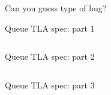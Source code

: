 \documentclass[12pt]{beamer}
\begin{document}
  {
  \begin{frame}{Can you guess type of bug?}
      \begin{center}
      \end{center}
  \end{frame}}
  \begin{frame}{Queue TLA spec: part 1}
      \begin{center}
          \inputminted[firstline=1,lastline=16,linenos,
            fontsize=\scriptsize]{tla}{figures/buffer.tla}
      \end{center}
  \end{frame}
  \begin{frame}{Queue TLA spec: part 2}
      \begin{center}
          \inputminted[firstline=16,lastline=31,linenos,
            fontsize=\scriptsize]{tla}{figures/buffer.tla}
      \end{center}
  \end{frame}
  \begin{frame}{Queue TLA spec: part 3}
      \begin{center}
          \inputminted[firstline=32,lastline=42,linenos,
            fontsize=\scriptsize]{tla}{figures/buffer.tla}
      \end{center}
  \end{frame}
\end{document}

